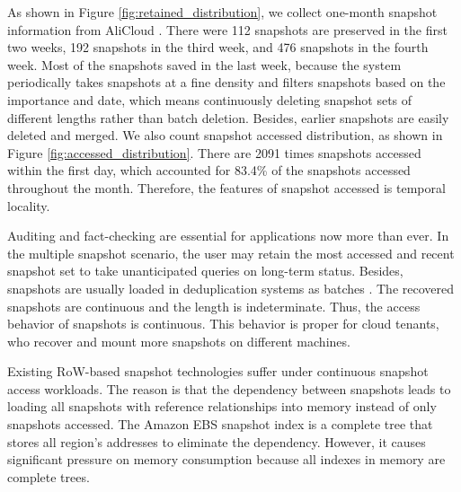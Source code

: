 \documentclass[sigconf, nonacm]{acmart}
\begin{document}
As shown in Figure \ref{fig:retained_distribution}, we collect one-month snapshot information from AliCloud \cite{alibackupset}. There were 112 snapshots are preserved in the first two weeks, 192 snapshots in the third week, and 476 snapshots in the fourth week. Most of the snapshots saved in the last week, because the system periodically takes snapshots at a fine density and filters snapshots based on the importance and date, which means continuously deleting snapshot sets of different lengths rather than batch deletion. 
Besides, earlier snapshots are easily deleted and merged.
We also count snapshot accessed distribution, as shown in Figure \ref{fig:accessed_distribution}. There are 2091 times snapshots accessed within the first day, which accounted for 83.4\% of the snapshots accessed throughout the month. Therefore, the features of snapshot accessed is temporal locality.


Auditing and fact-checking \cite{jo2019aggchecker,shaull2008skippy} are essential for applications now more than ever. 
In the multiple snapshot scenario, the user may retain the most accessed and recent snapshot set \cite{vrable2009cumulus} to take unanticipated queries on long-term status.
Besides, snapshots are usually loaded in deduplication systems as batches \cite{ren2021accelerating,zou2021dilemma}.
The recovered snapshots are continuous and the length is indeterminate.
Thus, the access behavior of snapshots is continuous. This behavior is proper for cloud tenants, who recover and mount  more snapshots on different machines.


Existing RoW-based snapshot technologies suffer under continuous snapshot access workloads. The reason is that the dependency between snapshots leads to loading all snapshots with reference relationships into memory instead of only snapshots accessed. The Amazon EBS snapshot index is a complete tree that stores all region's addresses to eliminate the dependency. However, it causes significant pressure on memory consumption because all indexes in memory are complete trees.
\end{document}
